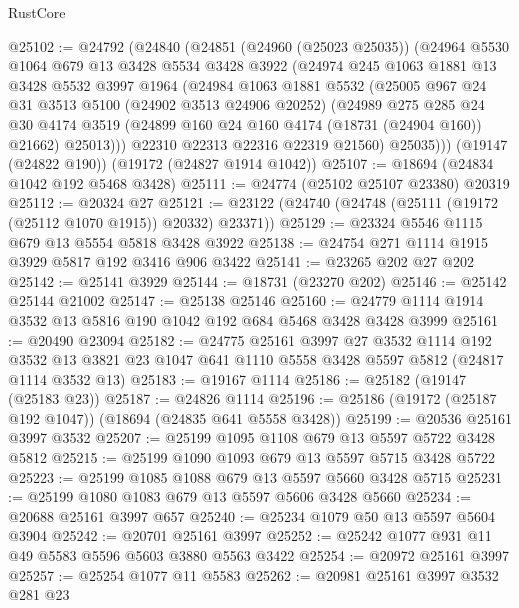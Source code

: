 \begin{lexlean}{RustCore}
\begin{coremodule}
@25102 := @24792
    (@24840
      (@24851
        (@24960 (@25023 @25035))
        (@24964
          @5530
          @1064
          @679
          @13
          @3428
          @5534
          @3428
          @3922
          (@24974
            @245
            @1063
            @1881
            @13
            @3428
            @5532
            @3997
            @1964
            (@24984
              @1063
              @1881
              @5532
              (@25005
                @967
                @24
                @31
                @3513
                @5100
                (@24902 @3513 @24906 @20252)
                (@24989
                  @275
                  @285
                  @24
                  @30
                  @4174
                  @3519
                  (@24899 @160 @24 @160 @4174 (@18731 (@24904 @160)) @21662)
                  @25013)))
            @22310
            @22313
            @22316
            @22319
            @21560)
          @25035)))
    (@19147 (@24822 @190))
    (@19172 (@24827 @1914 @1042))
@25107 := @18694 (@24834 @1042 @192 @5468 @3428)
@25111 := @24774 (@25102 @25107 @23380) @20319
@25112 := @20324 @27
@25121 := @23122 (@24740 (@24748 (@25111 (@19172 (@25112 @1070 @1915)) @20332) @23371))
@25129 := @23324 @5546 @1115 @679 @13 @5554 @5818 @3428 @3922
@25138 := @24754 @271 @1114 @1915 @3929 @5817 @192 @3416 @906 @3422
@25141 := @23265 @202 @27 @202
@25142 := @25141 @3929
@25144 := @18731 (@23270 @202)
@25146 := @25142 @25144 @21002
@25147 := @25138 @25146
@25160 := @24779 @1114 @1914 @3532 @13 @5816 @190 @1042 @192 @684 @5468 @3428 @3428 @3999
@25161 := @20490 @23094
@25182 := @24775
    @25161
    @3997
    @27
    @3532
    @1114
    @192
    @3532
    @13
    @3821
    @23
    @1047
    @641
    @1110
    @5558
    @3428
    @5597
    @5812
    (@24817 @1114 @3532 @13)
@25183 := @19167 @1114
@25186 := @25182 (@19147 (@25183 @23))
@25187 := @24826 @1114
@25196 := @25186 (@19172 (@25187 @192 @1047)) (@18694 (@24835 @641 @5558 @3428))
@25199 := @20536 @25161 @3997 @3532
@25207 := @25199 @1095 @1108 @679 @13 @5597 @5722 @3428 @5812
@25215 := @25199 @1090 @1093 @679 @13 @5597 @5715 @3428 @5722
@25223 := @25199 @1085 @1088 @679 @13 @5597 @5660 @3428 @5715
@25231 := @25199 @1080 @1083 @679 @13 @5597 @5606 @3428 @5660
@25234 := @20688 @25161 @3997 @657
@25240 := @25234 @1079 @50 @13 @5597 @5604 @3904
@25242 := @20701 @25161 @3997
@25252 := @25242 @1077 @931 @11 @49 @5583 @5596 @5603 @3880 @5563 @3422
@25254 := @20972 @25161 @3997
@25257 := @25254 @1077 @11 @5583
@25262 := @20981 @25161 @3997 @3532 @281 @23

\end{coremodule}
\end{lexlean}
